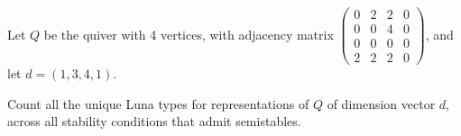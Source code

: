 Let $Q$ be the quiver with 4 vertices, with adjacency matrix $\begin{pmatrix} 0 &  2 & 2 & 0 \\ 0 & 0 & 4 & 0\\ 0 & 0 & 0 & 0\\ 2 & 2 & 2 & 0\end{pmatrix}$, and let $d = (1, 3, 4, 1)$.

Count all the unique Luna types for representations of $Q$ of dimension vector $d$, across all stability conditions that admit semistables.
